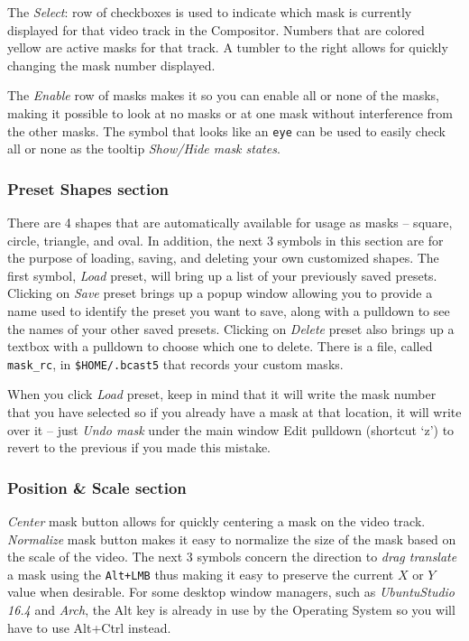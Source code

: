 The \textit{Select}: row of checkboxes is used to indicate which mask is currently displayed for that video track in the Compositor.  Numbers that are colored yellow are active masks for that track.  A tumbler to the right allows for quickly changing the mask number displayed.

The \textit{Enable} row of masks makes it so you can enable all or none of the masks, making it possible to look at no masks or at one mask without interference from the other masks. The symbol that looks like an \texttt{eye} can be used to easily check all or none as the tooltip \textit{Show/Hide mask states}.

\subsubsection*{Preset Shapes section}%
\label{ssub:preset_shape_section}

There are 4 shapes that are automatically available for usage as masks – square, circle, triangle, and oval.  In addition, the next 3 symbols in this section are for the purpose of loading, saving, and deleting your own customized shapes.  The first symbol, \textit{Load} preset, will bring up a list of your previously saved presets.  Clicking on \textit{Save} preset brings up a popup window allowing you to provide a name used to identify the preset you want to save, along with a pulldown to see the names of your other saved presets.   Clicking on \textit{Delete} preset also brings up a textbox with a pulldown to choose which one to delete.  There is a file, called \texttt{mask\_rc}, in \texttt{\$HOME/.bcast5} that records your custom masks.  

When you click \textit{Load} preset, keep in mind that it will write the mask number that you have selected so if you already have a mask at that location, it will write over it – just \textit{Undo mask} under the main window Edit pulldown (shortcut `z') to revert to the previous if you made this mistake.

\subsubsection*{Position \& Scale section}%
\label{ssub:position_scale_section}

\textit{Center} mask button allows for quickly centering a mask on the video track. 
\textit{Normalize} mask button makes it easy to normalize the size of the mask based on the scale of the video. 
The next 3 symbols concern the direction to \textit{drag translate} a mask using the \texttt{Alt+LMB} thus making it easy to preserve the current $X$ or $Y$ value when desirable.  For some desktop window managers,
such as \textit{UbuntuStudio 16.4} and \textit{Arch}, the Alt key is already in use by the Operating System
so you will have to use Alt+Ctrl instead.

